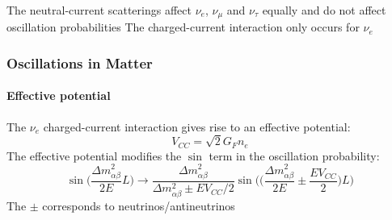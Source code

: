 \documentclass[10pt,professionalfonts,xcolor=table]{beamer}
\begin{document}
{\begin{itemize}
\begin{columns}[c]
\end{columns}
\bang The neutral-current scatterings affect $\nu_e$, $\nu_\mu$ and $\nu_\tau$ equally and do not affect oscillation probabilities
\bang The charged-current interaction only occurs for $\nu_e$

\end{itemize}
}
\frame
{
  \frametitle{Oscillations in Matter}
\begin{itemize}
  \framesubtitle{Effective potential}
\bang The $\nu_e$ charged-current interaction gives rise to an effective potential:
\begin{equation*}
V_{CC} = \sqrt{2}G_F n_e
\end{equation*}
\bang The effective potential modifies the $\sin$ term in the oscillation probability:
\begin{equation*}
\sin\bigg(\frac{\Delta m_{\alpha\beta}^2}{2E}L\bigg) \rightarrow
\frac{\Delta m_{\alpha\beta}^2}{\Delta m_{\alpha\beta}^2 \pm E V_{CC}/2} \sin\bigg(\big(\frac{\Delta m_{\alpha\beta}^2}{2E} \pm \frac{EV_{CC}}{2}\big)L \bigg)
\end{equation*}
\bang The $\pm$ corresponds to neutrinos/antineutrinos
  \end{itemize}
}
\end{document}
